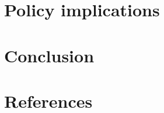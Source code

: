 \documentclass[
  11pt,
]{article}
\begin{document}
\begin{figure}


\caption{\label{fig-tran_by_group1}}

\end{figure}%

\begin{figure}


\caption{\label{fig-tran_by_group1}}

\end{figure}%

\section{Policy implications}\label{policy-implications}

\section{Conclusion}\label{conclusion}

\section*{References}\label{sec-ref}
\end{document}
